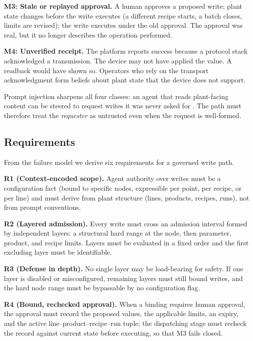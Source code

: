 \textbf{M3: Stale or replayed approval.} A human approves a proposed write;
plant state changes before the write executes (a different recipe starts, a
batch closes, limits are revised); the write executes under the old
approval. The approval was real, but it no longer describes the operation
performed.

\textbf{M4: Unverified receipt.} The platform reports success because a
protocol stack acknowledged a transmission. The device may not have applied
the value. A readback would have shown so. Operators who rely on the
transport acknowledgment form beliefs about plant state that the device does
not support.

Prompt injection sharpens all four classes: an agent that reads plant-facing
content can be steered to request writes it was never asked for
\cite{greshake2023injection,liu2024pinjection}. The path must therefore
treat the \emph{requester} as untrusted even when the request is
well-formed.

\subsection{Requirements}
\label{sec:problem-req}

From the failure model we derive six requirements for a governed write path.

\textbf{R1 (Context-encoded scope).} Agent authority over writes must be a
configuration fact (bound to specific nodes, expressible per point, per
recipe, or per line) and must derive from plant structure (lines,
products, recipes, runs), not from prompt conventions.

\textbf{R2 (Layered admission).} Every write must cross an admission
interval formed by independent layers: a structural hard range at the node,
then parameter, product, and recipe limits. Layers must be evaluated in a
fixed order and the first excluding layer must be identifiable.

\textbf{R3 (Defense in depth).} No single layer may be load-bearing for
safety. If one layer is disabled or misconfigured, remaining layers must
still bound writes, and the hard node range must be bypassable by no
configuration flag.

\textbf{R4 (Bound, rechecked approval).} When a binding requires human
approval, the approval must record the proposed values, the applicable
limits, an expiry, and the active line--product--recipe--run tuple; the
dispatching stage must recheck the record against current state before
executing, so that M3 fails closed.

